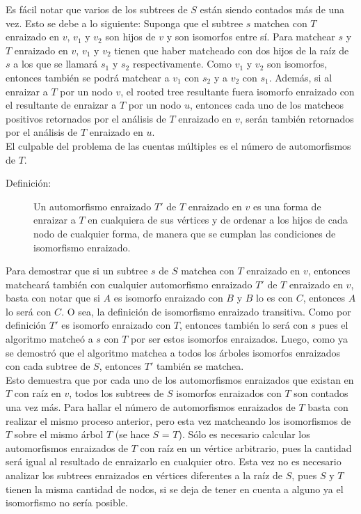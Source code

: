 \documentclass[a4paper,12pt,twocolumn]{article}
\begin{document}
		Es fácil notar que varios de los subtrees de $S$ están siendo contados más de una vez. Esto se debe a lo siguiente: Suponga que el subtree $s$ matchea con $T$ enraizado en $v$, $v_1$ y $v_2$ son hijos de $v$ y son isomorfos entre sí. Para matchear $s$ y $T$ enraizado en $v$, $v_1$ y $v_2$ tienen que haber matcheado con dos hijos de la raíz de $s$ a los que se llamará $s_1$ y $s_2$ respectivamente. Como $v_1$ y $v_2$ son isomorfos, entonces también se podrá matchear a $v_1$ con $s_2$ y a $v_2$ con $s_1$. Además, si al enraizar a $T$ por un nodo $v$, el rooted tree resultante fuera isomorfo enraizado con el resultante de enraizar a $T$ por un nodo $u$, entonces cada uno de los matcheos positivos retornados por el análisis de $T$ enraizado en $v$, serán también retornados por el análisis de $T$ enraizado en $u$.\\
		
		El culpable del problema de las cuentas múltiples es el número de automorfismos de $T$.\\
		
		\begin{description}
			\item[Definición:] Un automorfismo enraizado $T'$ de $T$ enraizado en $v$ es una forma de enraizar a $T$ en cualquiera de sus vértices y de ordenar a los hijos de cada nodo de cualquier forma, de manera que se cumplan las condiciones de isomorfismo enraizado.
		\end{description}
	
		Para demostrar que si un subtree $s$ de $S$ matchea con $T$ enraizado en $v$, entonces matcheará también con cualquier automorfismo enraizado $T'$ de $T$ enraizado en $v$, basta con notar que si $A$ es isomorfo enraizado con $B$ y $B$ lo es con $C$, entonces $A$ lo será con $C$. O sea, la definición de isomorfismo enraizado transitiva. Como por definición $T'$ es isomorfo enraizado con $T$, entonces también lo será con $s$ pues el algoritmo matcheó a $s$ con $T$ por ser estos isomorfos enraizados. Luego, como ya se demostró que el algoritmo matchea a todos los árboles isomorfos enraizados con cada subtree de $S$, entonces $T'$ también se matchea.\\		
		
		
		Esto demuestra que por cada uno de los automorfismos enraizados que existan en $T$ con raíz en $v$, todos los subtrees de $S$ isomorfos enraizados con $T$ son contados una vez más. Para hallar el número de automorfismos enraizados de $T$ basta con realizar el mismo proceso anterior, pero esta vez matcheando los isomorfismos de $T$ sobre el mismo árbol $T$ (se hace $S$ = $T$). Sólo es necesario calcular los automorfismos enraizados de $T$ con raíz en un vértice arbitrario, pues la cantidad será igual al resultado de enraizarlo en cualquier otro. Esta vez no es necesario analizar los subtrees enraizados en vértices diferentes a la raíz de $S$, pues $S$ y $T$ tienen la misma cantidad de nodos, si se deja de tener en cuenta a alguno ya el isomorfismo no sería posible.\\
				
\end{document}
